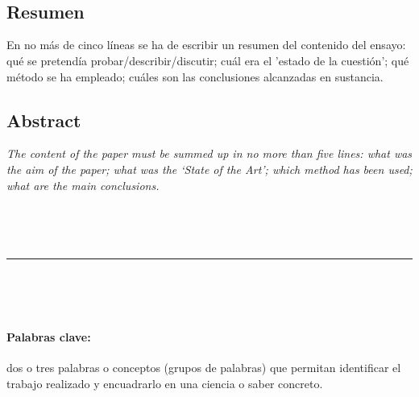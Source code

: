 \documentclass[a4paper,12pt]{article}
\newcommand{\vacio}{\phantom{relleno}}
\begin{document}
{%

\newpage

\renewcommand{\headrulewidth}{0.5pt}
\fancyhead[L]{\vacio}

\renewcommand{\footrulewidth}{0.5pt}
\fancyfoot[C]{\vacio}



\

\vacio

\

\subsection*{Resumen}
En no más de cinco líneas se ha de escribir un resumen del contenido del ensayo: qué se pretendía probar/describir/discutir; cuál era el 'estado de la cuestión’; qué método se ha empleado; cuáles son las conclusiones alcanzadas en sustancia.


\subsection*{Abstract}
\textsl{
The content of the paper must be summed up in no more than five lines: what was the aim of the paper; what was the ‘State of the Art’; which method has been used; what are the main conclusions.}

\ %

\

\hrule

\

\


\paragraph{Palabras clave:} dos o tres palabras o conceptos (grupos de palabras) que permitan identificar el trabajo realizado y encuadrarlo en una ciencia o saber concreto.

}
\end{document}
